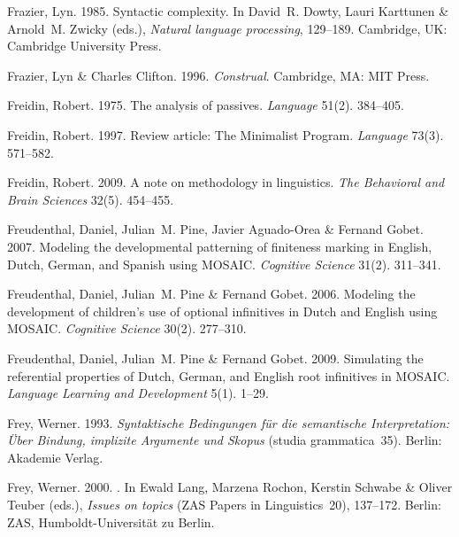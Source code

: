 \begin{thebibliography}{1420}
Frazier, Lyn. 1985.
\newblock Syntactic complexity.
\newblock In David~R. Dowty, Lauri Karttunen \& Arnold~M. Zwicky (eds.),
  \emph{Natural language processing}, 129--189. Cambridge, UK: Cambridge
  University Press.

Frazier, Lyn \& Charles Clifton. 1996.
\newblock \emph{Construal}.
\newblock Cambridge, MA: MIT Press.

Freidin, Robert. 1975.
\newblock The analysis of passives.
\newblock \emph{Language} 51(2). 384--405.

Freidin, Robert. 1997.
\newblock Review article: {The} {Minimalist Program}.
\newblock \emph{Language} 73(3). 571--582.

Freidin, Robert. 2009.
\newblock A note on methodology in linguistics.
\newblock \emph{The Behavioral and Brain Sciences} 32(5). 454--455.

Freudenthal, Daniel, Julian~M. Pine, Javier Aguado-Orea \& Fernand Gobet. 2007.
\newblock Modeling the developmental patterning of finiteness marking in
  {English}, {Dutch}, {German}, and {Spanish} using {MOSAIC}.
\newblock \emph{Cognitive Science} 31(2). 311--341.

Freudenthal, Daniel, Julian~M. Pine \& Fernand Gobet. 2006.
\newblock Modeling the development of children's use of optional infinitives in
  {Dutch} and {English} using {MOSAIC}.
\newblock \emph{Cognitive Science} 30(2). 277--310.

Freudenthal, Daniel, Julian~M. Pine \& Fernand Gobet. 2009.
\newblock Simulating the referential properties of {Dutch}, {German}, and
  {English} root infinitives in {MOSAIC}.
\newblock \emph{Language Learning and Development} 5(1). 1--29.

Frey, Werner. 1993.
\newblock \emph{{Syntaktische Bedingungen f{\"u}r die semantische
  Interpretation: {\"U}ber Bindung, implizite Argumente und Skopus}} (studia
  grammatica~35).
\newblock Berlin: Akademie Verlag.

Frey, Werner. 2000.
.
\newblock In Ewald Lang, Marzena Rochon, Kerstin Schwabe \& Oliver Teuber
  (eds.), \emph{Issues on topics} (ZAS Papers in Linguistics~20), 137--172.
  Berlin: ZAS, Humboldt-Universit{\"a}t zu Berlin.


\end{thebibliography}
